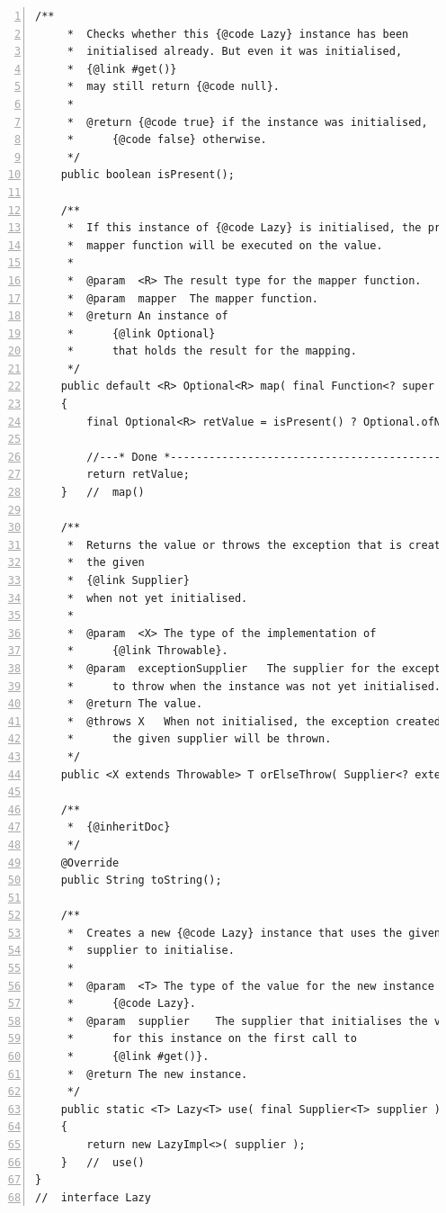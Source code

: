 \documentclass[11pt,a4paper, titlepage, parskip=half, headsepline, footsepline, cleardoublepage=current, headheight=1cm]{scrbook}
\begin{document}
\begin{lstlisting}[numbers=left,caption={Lazy.java}]
    /**
     *  Checks whether this {@code Lazy} instance has been 
     *  initialised already. But even it was initialised,
     *  {@link #get()}
     *  may still return {@code null}.
     *
     *  @return {@code true} if the instance was initialised, 
     *      {@code false} otherwise.
     */
    public boolean isPresent();

    /**
     *  If this instance of {@code Lazy} is initialised, the provided 
     *  mapper function will be executed on the value.
     *
     *  @param  <R> The result type for the mapper function.
     *  @param  mapper  The mapper function.
     *  @return An instance of
     *      {@link Optional}
     *      that holds the result for the mapping.
     */
    public default <R> Optional<R> map( final Function<? super T,? extends R> mapper )
    {
        final Optional<R> retValue = isPresent() ? Optional.ofNullable( mapper.apply( get() ) ) : Optional.empty();

        //---* Done *------------------------------------------------
        return retValue;
    }   //  map()

    /**
     *  Returns the value or throws the exception that is created by 
     *  the given
     *  {@link Supplier}
     *  when not yet initialised.
     *
     *  @param  <X> The type of the implementation of
     *      {@link Throwable}.
     *  @param  exceptionSupplier   The supplier for the exception 
     *      to throw when the instance was not yet initialised.
     *  @return The value.
     *  @throws X   When not initialised, the exception created by 
     *      the given supplier will be thrown.
     */
    public <X extends Throwable> T orElseThrow( Supplier<? extends X> exceptionSupplier ) throws X;

    /**
     *  {@inheritDoc}
     */
    @Override
    public String toString();

    /**
     *  Creates a new {@code Lazy} instance that uses the given 
     *  supplier to initialise.
     *
     *  @param  <T> The type of the value for the new instance of 
     *      {@code Lazy}.
     *  @param  supplier    The supplier that initialises the value 
     *      for this instance on the first call to
     *      {@link #get()}.
     *  @return The new instance.
     */
    public static <T> Lazy<T> use( final Supplier<T> supplier )
    {
        return new LazyImpl<>( supplier );
    }   //  use()
}
//  interface Lazy
\end{lstlisting}
\end{document}
